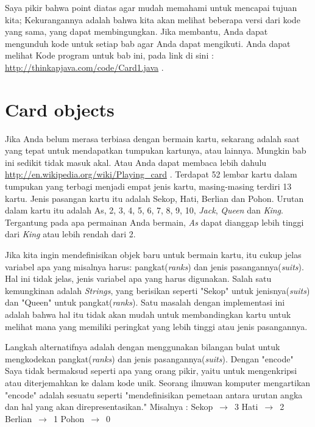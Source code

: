 Saya pikir bahwa point diatas agar mudah memahami untuk mencapai tujuan kita; Kekurangannya adalah bahwa kita akan melihat beberapa versi dari kode yang sama, yang dapat membingungkan. Jika membantu, Anda dapat mengunduh kode untuk setiap bab agar Anda dapat mengikuti. Anda dapat melihat Kode program untuk bab ini, pada link di sini : \url{http://thinkapjava.com/code/Card1.java} .

\section{Card objects}
Jika Anda belum merasa terbiasa dengan bermain kartu, sekarang adalah saat yang tepat untuk mendapatkan tumpukan kartunya, atau lainnya. Mungkin bab ini sedikit tidak masuk akal. Atau Anda dapat membaca lebih dahulu \url{http://en.wikipedia.org/wiki/Playing_card} .
Terdapat 52 lembar kartu dalam tumpukan yang terbagi menjadi empat jenis kartu, masing-masing terdiri 13 kartu. Jenis pasangan kartu itu adalah Sekop, Hati, Berlian dan Pohon. Urutan dalam kartu itu adalah As, 2, 3, 4, 5, 6, 7, 8, 9, 10, \textit{Jack}, \textit{Queen} dan \textit{King}. Tergantung pada apa permainan Anda bermain, \textit{As} dapat dianggap lebih tinggi dari \textit{King} atau lebih rendah dari 2. \par

\noindent Jika kita ingin mendefinisikan objek baru untuk bermain kartu, itu cukup jelas variabel apa yang misalnya harus: pangkat(\textit{ranks}) dan jenis pasangannya(\textit{suits}). Hal ini tidak jelas, jenis variabel apa yang harus digunakan. Salah satu kemungkinan adalah \textit{Strings}, yang berisikan seperti "Sekop" untuk jenisnya(\textit{suits}) dan "Queen" untuk pangkat(\textit{ranks}). Satu masalah dengan implementasi ini adalah bahwa hal itu tidak akan mudah untuk membandingkan kartu untuk melihat mana yang memiliki peringkat yang lebih tinggi atau jenis pasangannya.

\noindent Langkah alternatifnya adalah dengan menggunakan bilangan bulat untuk mengkodekan pangkat(\textit{ranks}) dan jenis pasangannya({\textit{suits}}). Dengan "encode" Saya tidak bermaksud seperti apa yang orang pikir, yaitu untuk mengenkripsi atau diterjemahkan ke dalam kode unik. Seorang ilmuwan komputer mengartikan "encode" adalah sesuatu seperti "mendefinisikan pemetaan antara urutan angka dan hal yang akan direpresentasikan." Misalnya :
\noindent 
\newline Sekop $\,\to\,$ 3 
\newline Hati $\,\to\,$ 2 
\newline Berlian  $\,\to\,$ 1 
\newline Pohon $\,\to\,$ 0 \par

